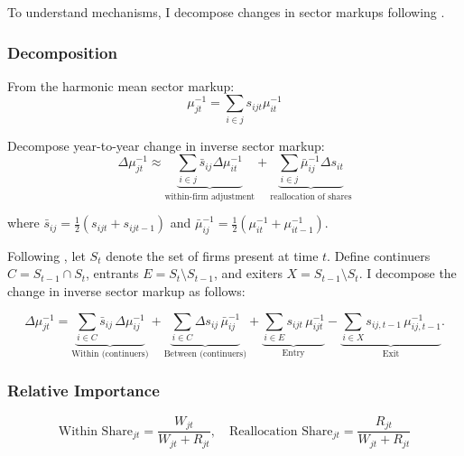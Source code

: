 \documentclass[12pt]{article}
\begin{document}
To understand mechanisms, I decompose changes in sector markups following \cite{bursteinBottomUpMarkupFluctuations2025}.

\subsubsection{Decomposition}

From the harmonic mean sector markup:
\[
\mu_{jt}^{-1} = \sum_{i \in j} s_{ijt} \mu_{it}^{-1}
\]

Decompose year-to-year change in inverse sector markup:
\begin{equation}
\Delta \mu_{jt}^{-1} \approx \underbrace{\sum_{i \in j} \bar{s}_{ij} \Delta \mu_{it}^{-1}}_{\text{within-firm adjustment}} + \underbrace{\sum_{i \in j} \bar{\mu}_{ij}^{-1} \Delta s_{it}}_{\text{reallocation of shares}} \tag{7}
\end{equation}

where $\bar{s}_{ij} = \frac{1}{2}(s_{ijt} + s_{ijt-1})$ and $\bar{\mu}_{ij}^{-1} = \frac{1}{2}(\mu_{it}^{-1} + \mu_{it-1}^{-1})$.

Following \textcite{melitzDynamicOlleyPakesProductivity2015}, 
let $S_t$ denote the set of firms present at time $t$. 
Define continuers $C = S_{t-1} \cap S_t$, 
entrants $E = S_t \setminus S_{t-1}$, 
and exiters $X = S_{t-1} \setminus S_t$. 
I decompose the change in inverse sector markup as follows:

\[
\Delta \mu_{jt}^{-1}
=
\underbrace{\sum_{i \in C} \bar{s}_{ij}\,\Delta \mu_{ij}^{-1}}_{\text{Within (continuers)}}
+
\underbrace{\sum_{i \in C} \Delta s_{ij}\,\bar{\mu}_{ij}^{-1}}_{\text{Between (continuers)}}
+
\underbrace{\sum_{i \in E} s_{ijt}\,\mu_{ijt}^{-1}}_{\text{Entry}}
-
\underbrace{\sum_{i \in X} s_{ij,t-1}\,\mu_{ij,t-1}^{-1}}_{\text{Exit}} .
\]


\subsubsection{Relative Importance}

\[
\text{Within Share}_{jt} = \frac{W_{jt}}{W_{jt} + R_{jt}}, \quad \text{Reallocation Share}_{jt} = \frac{R_{jt}}{W_{jt} + R_{jt}}
\]
\end{document}
